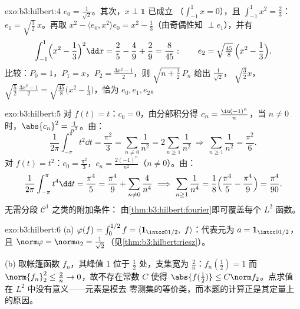 \begin{solution}{exo:b3:hilbert:4}
$e_0 = \frac1{\sqrt2}$。其次，$x \perp \mathbf 1$ 已成立
（$\int_{-1}^1x = 0$），且 $\int_{-1}^1x^2 = \frac23$：$e_1 =
\sqrt{\tfrac32}\,x$。再取 $x^2 - \langle e_0, x^2\rangle e_0 =
x^2 - \frac13$（由奇偶性知 $\perp e_1$），并有
\[
\int_{-1}^1\Bigl(x^2 - \frac13\Bigr)^2\dd x = \frac25 -
\frac49 + \frac29 = \frac{8}{45}:
\qquad e_2 = \sqrt{\tfrac{45}8}\,\Bigl(x^2 - \frac13\Bigr).
\]
比较：$P_0 = 1$，$P_1 = x$，$P_2 = \frac{3x^2 - 1}2$，则
$\sqrt{n + \tfrac12}\,P_n$ 给出 $\frac1{\sqrt2}$，
$\sqrt{\frac32}x$，$\sqrt{\frac52}\,\frac{3x^2-1}2 =
\sqrt{\frac{45}8}\bigl(x^2 - \frac13\bigr)$，恰为 $e_0, e_1,
e_2$。
\end{solution}

\begin{solution}{exo:b3:hilbert:5}
对 $f(t) = t$：$c_0 = 0$，由分部积分得 $c_n =
\frac{\iu(-1)^n}{n}$，当 $n \neq 0$ 时，$\abs{c_n}^2 =
\frac1{n^2}$。由：
\[
\frac1{2\pi}\int_{-\pi}^\pi t^2\dd t = \frac{\pi^2}3
= \sum_{n\neq0}\frac1{n^2} = 2\sum_{n\geq1}\frac1{n^2}
\ \Longrightarrow\ \sum_{n\geq1}\frac1{n^2} = \frac{\pi^2}6 .
\]
对 $f(t) = t^2$：$c_0 = \frac{\pi^2}3$，$c_n =
\frac{2(-1)^n}{n^2}$（$n \ne 0$）。由：
\[
\frac1{2\pi}\int_{-\pi}^{\pi}t^4\dd t = \frac{\pi^4}5
= \frac{\pi^4}9 + \sum_{n\neq0}\frac4{n^4}
\ \Longrightarrow\
\sum_{n\geq1}\frac1{n^4} = \frac18\Bigl(\frac{\pi^4}5 -
\frac{\pi^4}9\Bigr) = \frac{\pi^4}{90} .
\]
无需分段 $\mathcal C^1$ 之类的附加条件：
由\cref{thm:b3:hilbert:fourier}即可覆盖每个 $L^2$ 函数。
\end{solution}

\begin{solution}{exo:b3:hilbert:6}
(a) $\varphi(f) = \int_0^{1/2}f = \langle\mathbf
1_{\intcc0{1/2}},\ f\rangle$：代表元为 $a =
\mathbf 1_{\intcc0{1/2}}$，且 $\norm\varphi = \norm a_2 =
\frac1{\sqrt2}$（见\cref{thm:b3:hilbert:riesz}）。

(b) 取帐篷函数 $f_n$，其峰值 $1$ 位于
$\frac12$ 处，支集宽为 $\frac2n$：$f_n(\tfrac12) = 1$
而 $\norm{f_n}_2^2 \leq \frac2n \to 0$，故不存在常数 $C$
使得 $\abs{f(\frac12)} \leq C\norm f_2$。点求值
在 $L^2$ 中没有意义——元素是模去
零测集的等价类，而本题的计算正是其定量上的原因。
\end{solution}

